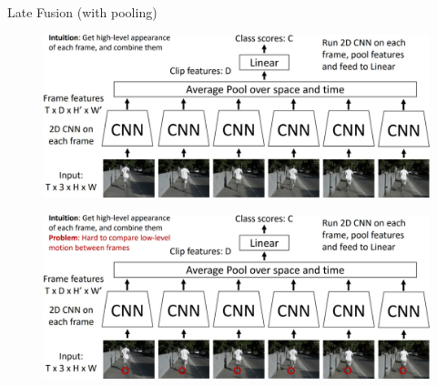 \begin{frame}[allowframebreaks]{Late Fusion (with pooling)}
    \begin{figure}
        \centering
        \includegraphics[width=1\textwidth,height=0.9\textheight,keepaspectratio]{images/video/slide_11_1_img.jpg}
    \end{figure}
\framebreak
    \begin{figure}
        \centering
        \includegraphics[width=1\textwidth,height=0.9\textheight,keepaspectratio]{images/video/slide_12_1_img.jpg}
    \end{figure}
\end{frame}